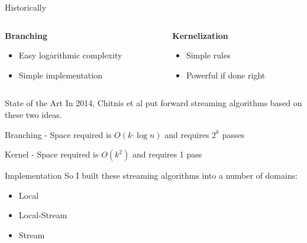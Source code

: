 \documentclass{beamer}
\begin{document}
\begin{frame}{Historically}
    \begin{block}{}
        \begin{columns}
            \begin{column}{0.45\textwidth}
                \textbf{Branching}

                \begin{itemize}
                    \item Easy logarithmic complexity
                    \item Simple implementation
                \end{itemize}
            \end{column}
            \begin{column}{0.45\textwidth}
                \textbf{Kernelization}

                \begin{itemize}
                    \item Simple rules
                    \item Powerful if done right
                \end{itemize}
            \end{column}
        \end{columns}
    \end{block}
\end{frame}

\begin{frame}{State of the Art}
    In 2014, Chitnis et al put forward streaming algorithms based on these two ideas.

    Branching - Space required is $O(k \boldsymbol\cdot \log n)$ and requires $2^k$ passes

    Kernel - Space required is $O(k^2)$ and requires 1 pass
\end{frame}

\begin{frame}{Implementation}
    So I built these streaming algorithms into a number of domains:

    \begin{itemize}
        \item Local
        \item Local-Stream
        \item Stream
    \end{itemize}
\end{frame}
\end{document}
